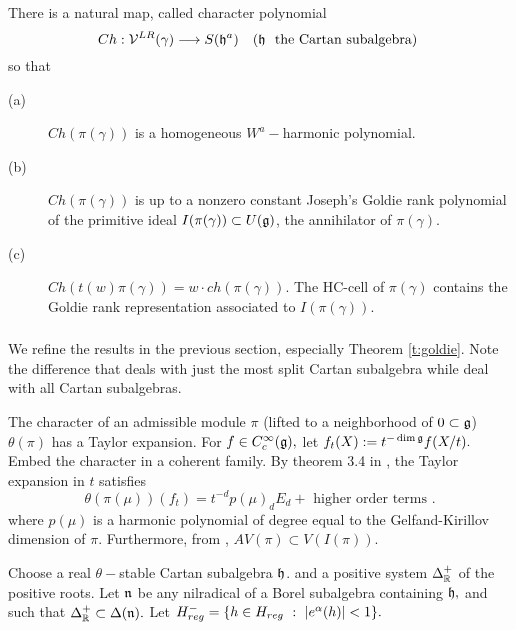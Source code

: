 \documentclass[11pt ,reqno]{amsart}
\begin{document}
\begin{theorem}\label{t:goldie} There is a natural map, called character
  polynomial 
  $$Ch:{\mathcal V}^{LR}(\gamma)\longrightarrow S({\mathfrak{h}}^a)\quad ({\mathfrak{h}}\ \text{ the
    Cartan subalgebra) }$$   so that
  \begin{description}
  \item[(a) ] $Ch (\pi(\gamma))$ is a homogeneous $W^a-$harmonic polynomial.
  \item[(b)] $Ch(\pi(\gamma)) $ is up to a nonzero constant Joseph's
    Goldie rank polynomial of  the primitive ideal
    $I(\pi(\gamma))\subset U({\mathfrak{g}})$, the annihilator of
    $\pi(\gamma).$ 
    \item[(c)] $Ch(t(w)\pi(\gamma))=w\cdot ch(\pi(\gamma)).$ The
      HC-cell of $\pi(\gamma)$ contains the Goldie rank representation
      associated to $I(\pi(\gamma))$. 
  \end{description}
  
\end{theorem}
\subsubsection{} We refine the results in the previous section,
especially Theorem \ref{t:goldie}. Note the difference that \cite{K}
deals with just the most split Cartan subalgebra while \cite{C} deal
with all Cartan subalgebras.

The character of an admissible module $\pi$ (lifted to a neighborhood of $0\subset {\mathfrak{g}}$)
$\theta(\pi)$ has a Taylor expansion. For $f\in C_c^\infty ({\mathfrak{g}}),$
let $f_t(X):=t^{-\dim {\mathfrak{g}}}f(X/t).$ 
Embed the character in a coherent family. 
By theorem 3.4 in \cite{C}, the Taylor expansion in $t$ satisfies 
$$
\theta(\pi(\mu))(f_t)=t^{-d}p(\mu)_dE_{d}+ \text{ higher order terms }.
$$
where $p(\mu)$ is a harmonic polynomial of degree equal to the
Gelfand-Kirillov dimension of $\pi.$ Furthermore, from \cite{BV1},
$AV(\pi)\subset V(I(\pi))$.



Choose a real $\theta-$stable Cartan subalgebra ${\mathfrak{h}}$. and a
positive system $\Delta_{\mathbb R}^+$ of the positive roots.  Let ${\mathfrak{n}}$ be
any nilradical of a Borel subalgebra containing ${\mathfrak{h}},$ and such that
$\Delta^+_{\mathbb R}\subset \Delta({\mathfrak{n}}).$ Let $H^-_{reg}=\{h\in H_{reg}\ :\
|e^{\alpha}(h)|<1\}.$  
\end{document}
